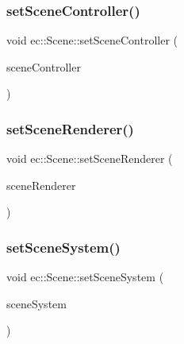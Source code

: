 \subsubsection{\texorpdfstring{set\+Scene\+Controller()}{setSceneController()}}
{\footnotesize\ttfamily void ec\+::\+Scene\+::set\+Scene\+Controller (\begin{DoxyParamCaption}\item[{\mbox{\hyperlink{classec_1_1_scene_controller}{Scene\+Controller}} $\ast$}]{scene\+Controller }\end{DoxyParamCaption})}

\mbox{\label{classec_1_1_scene_a4a000b3820dfcf578ed80bae3bf5f432}} 
\subsubsection{\texorpdfstring{set\+Scene\+Renderer()}{setSceneRenderer()}}
{\footnotesize\ttfamily void ec\+::\+Scene\+::set\+Scene\+Renderer (\begin{DoxyParamCaption}\item[{const \mbox{\hyperlink{classec_1_1_scene_renderer}{Scene\+Renderer}} \&}]{scene\+Renderer }\end{DoxyParamCaption})}

\mbox{\label{classec_1_1_scene_a87a6277fea206956c0a7175cf308ece0}} 
\subsubsection{\texorpdfstring{set\+Scene\+System()}{setSceneSystem()}}
{\footnotesize\ttfamily void ec\+::\+Scene\+::set\+Scene\+System (\begin{DoxyParamCaption}\item[{\mbox{\hyperlink{classec_1_1_scene_system}{Scene\+System}} $\ast$}]{scene\+System }\end{DoxyParamCaption})}

\mbox{\label{classec_1_1_scene_a09deb945a2c8255d70a68b0aaddaecb6}} 
